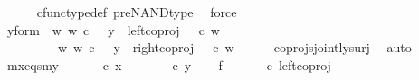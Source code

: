 \begin{isabellebody}
\ \ \ \ \isamarkupfalse%
\ cfunc{\isacharunderscore}{\kern0pt}type{\isacharunderscore}{\kern0pt}def\ pre{\isacharunderscore}{\kern0pt}NAND{\isacharunderscore}{\kern0pt}type\ \isamarkupfalse%
\ force\isanewline
\ \ \isamarkupfalse%
\ \isamarkupfalse%
\ y{\isacharunderscore}{\kern0pt}form{\isacharcolon}{\kern0pt}\ {\isachardoublequoteopen}{\isacharparenleft}{\kern0pt}{\isasymexists}\ w{\isachardot}{\kern0pt}\ w\ {\isasymin}\isactrlsub c\ {\isasymone}\ {\isasymand}\ y\ {\isacharequal}{\kern0pt}\ left{\isacharunderscore}{\kern0pt}coproj\ {\isasymone}\ {\isacharparenleft}{\kern0pt}{\isasymone}{\isasymCoprod}{\isasymone}{\isacharparenright}{\kern0pt}\ {\isasymcirc}\isactrlsub c\ w{\isacharparenright}{\kern0pt}\isanewline
\ \ \ \ \ \ {\isasymor}\ \ {\isacharparenleft}{\kern0pt}{\isasymexists}\ w{\isachardot}{\kern0pt}\ w\ {\isasymin}\isactrlsub c\ {\isasymone}{\isasymCoprod}{\isasymone}\ {\isasymand}\ y\ {\isacharequal}{\kern0pt}\ right{\isacharunderscore}{\kern0pt}coproj\ {\isasymone}\ {\isacharparenleft}{\kern0pt}{\isasymone}{\isasymCoprod}{\isasymone}{\isacharparenright}{\kern0pt}\ {\isasymcirc}\isactrlsub c\ w{\isacharparenright}{\kern0pt}{\isachardoublequoteclose}\isanewline
\ \ \ \ \isamarkupfalse%
\ coprojs{\isacharunderscore}{\kern0pt}jointly{\isacharunderscore}{\kern0pt}surj\ \isamarkupfalse%
\ auto\isanewline
\isanewline
\ \ \isamarkupfalse%
\ mx{\isacharunderscore}{\kern0pt}eqs{\isacharunderscore}{\kern0pt}my{\isacharcolon}{\kern0pt}\ {\isachardoublequoteopen}{\isasymlangle}{\isasymf}{\isacharcomma}{\kern0pt}\ {\isasymf}{\isasymrangle}\ {\isasymamalg}\ {\isasymlangle}{\isasymt}{\isacharcomma}{\kern0pt}{\isasymf}{\isasymrangle}\ {\isasymamalg}\ {\isasymlangle}{\isasymf}{\isacharcomma}{\kern0pt}{\isasymt}{\isasymrangle}\ {\isasymcirc}\isactrlsub c\ x\ {\isacharequal}{\kern0pt}\ {\isasymlangle}{\isasymf}{\isacharcomma}{\kern0pt}\ {\isasymf}{\isasymrangle}\ {\isasymamalg}\ {\isasymlangle}{\isasymt}{\isacharcomma}{\kern0pt}{\isasymf}{\isasymrangle}\ {\isasymamalg}\ {\isasymlangle}{\isasymf}{\isacharcomma}{\kern0pt}{\isasymt}{\isasymrangle}\ {\isasymcirc}\isactrlsub c\ y{\isachardoublequoteclose}\isanewline
\isanewline
\ \ \isamarkupfalse%
\ f{}{\isacharcolon}{\kern0pt}\ {\isachardoublequoteopen}{\isasymlangle}{\isasymf}{\isacharcomma}{\kern0pt}\ {\isasymf}{\isasymrangle}\ {\isasymamalg}\ {\isasymlangle}{\isasymt}{\isacharcomma}{\kern0pt}{\isasymf}{\isasymrangle}\ {\isasymamalg}\ {\isasymlangle}{\isasymf}{\isacharcomma}{\kern0pt}{\isasymt}{\isasymrangle}\ {\isasymcirc}\isactrlsub c\ left{\isacharunderscore}{\kern0pt}coproj\ {\isasymone}\ {\isacharparenleft}{\kern0pt}{\isasymone}\ {\isasymCoprod}\ {\isasymone}{\isacharparenright}{\kern0pt}\ {\isacharequal}{\kern0pt}\ {\isasymlangle}{\isasymf}{\isacharcomma}{\kern0pt}\ {\isasymf}{\isasymrangle}{\isachardoublequoteclose}\isanewline

\end{isabellebody}
